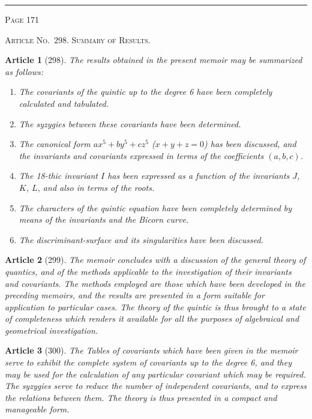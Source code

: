 \documentclass[11pt,a4paper]{article}
\theoremstyle{cayley}
\newtheorem{art}{Article}
\begin{document}
\vspace{1em}
\noindent\rule{\textwidth}{0.4pt}
\begin{center}\textsc{Page 171}\end{center}
\newpage

\begin{center}
\textsc{Article No.\ 298. Summary of Results.}
\end{center}

\begin{art}[298]
The results obtained in the present memoir may be summarized as follows:
\begin{enumerate}[label=\arabic*.,itemsep=2pt]
\item The covariants of the quintic up to the degree 6 have been completely calculated and tabulated.
\item The syzygies between these covariants have been determined.
\item The canonical form $ax^5 + by^5 + cz^5$ ($x+y+z=0$) has been discussed, and the invariants and covariants expressed in terms of the coefficients $(a, b, c)$.
\item The 18-thic invariant $I$ has been expressed as a function of the invariants $J$, $K$, $L$, and also in terms of the roots.
\item The characters of the quintic equation have been completely determined by means of the invariants and the Bicorn curve.
\item The discriminant-surface and its singularities have been discussed.
\end{enumerate}
\end{art}

\begin{art}[299]
The memoir concludes with a discussion of the general theory of quantics, and of the methods applicable to the investigation of their invariants and covariants. The methods employed are those which have been developed in the preceding memoirs, and the results are presented in a form suitable for application to particular cases. The theory of the quintic is thus brought to a state of completeness which renders it available for all the purposes of algebraical and geometrical investigation.
\end{art}

\begin{art}[300]
The Tables of covariants which have been given in the memoir serve to exhibit the complete system of covariants up to the degree 6, and they may be used for the calculation of any particular covariant which may be required. The syzygies serve to reduce the number of independent covariants, and to express the relations between them. The theory is thus presented in a compact and manageable form.
\end{art}
\end{document}
